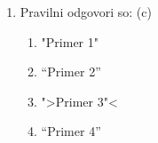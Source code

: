 \documentclass[11pt]{article}
\begin{document}
\begin{enumerate}
      \item Pravilni odgovori so: (c) %
        \begin{enumerate}
          \item "Primer 1"
          \item ``Primer 2''
          \item ">Primer 3"<
          \item "`Primer 4"'
        \end{enumerate}
    
\end{enumerate}
\end{document}
